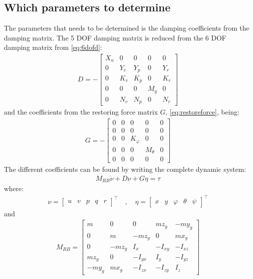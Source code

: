\subsection{Which parameters to determine}
The parameters that needs to be determined is the damping coefficients
from the damping matrix. The 5 \ac{DOF} damping matrix is reduced from the 6 \ac{DOF} damping matrix from \ref{eq:6dofd}:
\begin{align}
D = -
\begin{bmatrix}
X_u & 0 & 0 & 0 & 0\\
0 & Y_v & Y_p & 0 & Y_r\\
0 & K_v & K_p & 0 & K_r\\
0 & 0 & 0 & M_q & 0\\
0 & N_v & N_p & 0 & N_r
\end{bmatrix}
\end{align}
and the coefficients from the restoring force matrix $G$, \ref{eq:restoreforce}, being:
\begin{align}
G = -
\begin{bmatrix}
0 & 0 & 0 & 0 & 0\\
0 & 0 & 0 & 0 & 0\\
0 & 0 & K_\varphi & 0 & 0\\
0 & 0 & 0 & M_\theta & 0\\
0 & 0 & 0 & 0 & 0
\end{bmatrix}
\end{align}
The different coefficients can be found by writing the complete dynamic system:
\begin{align}
M_{RB} \dot \nu + D\nu + G\eta = \tau
\end{align}
where:
\begin{align}
\nu =
\begin{bmatrix}
u & v & p & q & r
\end{bmatrix}^\top
\quad , \quad
\eta =
\begin{bmatrix}
x & y & \varphi & \theta & \psi
\end{bmatrix}^\top
\end{align}
and
\begin{align}
M_{RB} =
\begin{bmatrix}
m & 0 & 0 & mz_g & -my_g\\
0 & m & -mz_g & 0 & mx_g\\
0 & -mz_g & I_x & -I_{xy} & -I_{xz}\\
mz_g & 0 & -I_{yx} & I_y & -I_{yz}\\
-my_g & mx_g & -I_{zx} & -I_{zy} & I_z
\end{bmatrix}
\end{align}
